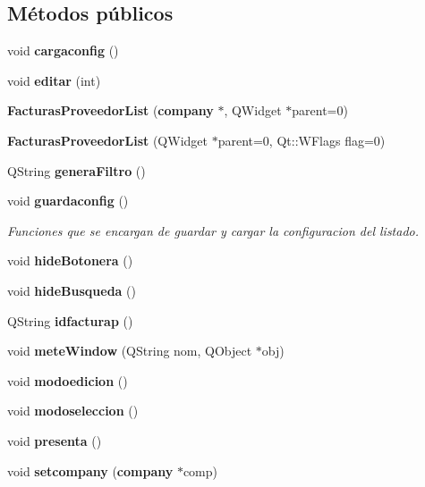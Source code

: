 \subsection*{M\'{e}todos p\'{u}blicos}
\begin{CompactItemize}
\item 
void {\bf cargaconfig} ()\label{classFacturasProveedorList_a0}

\item 
void {\bf editar} (int)\label{classFacturasProveedorList_a1}

\item 
{\bf Facturas\-Proveedor\-List} ({\bf company} $\ast$, QWidget $\ast$parent=0)\label{classFacturasProveedorList_a2}

\item 
{\bf Facturas\-Proveedor\-List} (QWidget $\ast$parent=0, Qt::WFlags flag=0)\label{classFacturasProveedorList_a3}

\item 
QString {\bf genera\-Filtro} ()
\item 
void {\bf guardaconfig} ()\label{classFacturasProveedorList_a5}

\begin{CompactList}\small\item\em Funciones que se encargan de guardar y cargar la configuracion del listado. \item\end{CompactList}\item 
void {\bf hide\-Botonera} ()\label{classFacturasProveedorList_a6}

\item 
void {\bf hide\-Busqueda} ()\label{classFacturasProveedorList_a7}

\item 
QString {\bf idfacturap} ()\label{classFacturasProveedorList_a8}

\item 
void {\bf mete\-Window} (QString nom, QObject $\ast$obj)\label{classFacturasProveedorList_a9}

\item 
void {\bf modoedicion} ()\label{classFacturasProveedorList_a10}

\item 
void {\bf modoseleccion} ()\label{classFacturasProveedorList_a11}

\item 
void {\bf presenta} ()
\item 
void {\bf setcompany} ({\bf company} $\ast$comp)\label{classFacturasProveedorList_a13}


\end{CompactItemize}
